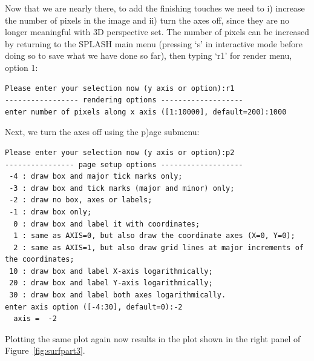 \documentclass[a4paper,10pt]{article}
\newcommand{\splash}{\textsc{SPLASH }}
\begin{document}
 Now that we are nearly there, to add the finishing touches we need to i) increase the number of pixels in the image and ii) turn the axes off, since they are no longer meaningful with 3D perspective set. The number of pixels can be increased by returning to the \splash main menu (pressing `s' in interactive mode before doing so to save what we have done so far), then typing `r1' for render menu, option 1:
\begin{verbatim}
Please enter your selection now (y axis or option):r1
----------------- rendering options -------------------
enter number of pixels along x axis ([1:10000], default=200):1000
\end{verbatim}
Next, we turn the axes off using the p)age submenu:
\begin{verbatim}
Please enter your selection now (y axis or option):p2
---------------- page setup options -------------------
 -4 : draw box and major tick marks only;
 -3 : draw box and tick marks (major and minor) only;
 -2 : draw no box, axes or labels;
 -1 : draw box only;
  0 : draw box and label it with coordinates;
  1 : same as AXIS=0, but also draw the coordinate axes (X=0, Y=0);
  2 : same as AXIS=1, but also draw grid lines at major increments of the coordinates;
 10 : draw box and label X-axis logarithmically;
 20 : draw box and label Y-axis logarithmically;
 30 : draw box and label both axes logarithmically.
enter axis option ([-4:30], default=0):-2
  axis =  -2
\end{verbatim}
 Plotting the same plot again now results in the plot shown in the right panel of Figure~\ref{fig:surfpart3}.
\end{document}
